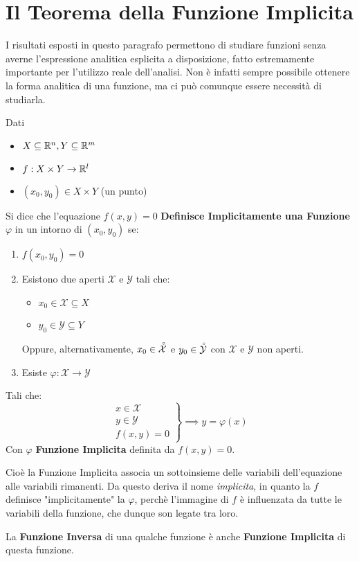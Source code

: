 \newpage
\section{Il Teorema della Funzione Implicita}
I risultati esposti in questo paragrafo permettono di studiare funzioni senza averne l'espressione analitica esplicita a disposizione, fatto estremamente importante per l'utilizzo reale dell'analisi. Non è infatti sempre possibile ottenere la forma analitica di una funzione, ma ci può comunque essere necessità di studiarla.
\begin{definition}
	\label{def:funz_impl}
	Dati
	\begin{itemize}[noitemsep]
		\item $X \subseteq \mathbb{R}^n, Y \subseteq \mathbb{R}^m$
		\item $f: X \times Y \to \mathbb{R}^l$
		\item $(x_0, y_0) \in X \times Y$ (un punto)
	\end{itemize}
	Si dice che l'equazione $f(x,y) = 0$ \textbf{Definisce Implicitamente una Funzione} $\varphi$ in un intorno di $(x_0,y_0)$ se:
	\begin{enumerate}
		\item $f(x_0,y_0) = 0$
		\item Esistono due aperti $\mathcal{X}$ e $\mathcal{Y}$ tali che:
			\begin{itemize}[noitemsep, topsep=0pt]
				\item $x_0 \in \mathcal{X} \subseteq X$
				\item $y_0 \in \mathcal{Y} \subseteq Y$
			\end{itemize}
			\begin{note}
				Oppure, alternativamente, $x_0 \in \accentset{\circ}{\mathcal{X}}$ e $y_0 \in \accentset{\circ}{\mathcal{Y}}$ con $\mathcal{X}$ e $\mathcal{Y}$ non aperti.
			\end{note}\vspace*{-2ex}
		\item Esiste $\varphi: \mathcal{X} \to \mathcal{Y}$
	\end{enumerate}
	Tali che:
	\[
		\left.
		\begin{array}{l}
			x \in \mathcal{X}\\
			y \in \mathcal{Y}\\
			f(x,y) = 0
		\end{array}
		\right\}
		\implies
		y = \varphi(x)
	\]
	Con $\varphi$ \textbf{Funzione Implicita} definita da $f(x,y)=0$.

	\vspace*{\baselineskip}
	Cioè la Funzione Implicita associa un sottoinsieme delle variabili dell'equazione alle variabili rimanenti. Da questo deriva il nome \textit{implicita}, in quanto la $f$ definisce "implicitamente" la $\varphi$, perchè l'immagine di $f$ è influenzata da tutte le variabili della funzione, che dunque son legate tra loro.
	\begin{note}
		La \textbf{Funzione Inversa} di una qualche funzione è anche \textbf{Funzione Implicita} di questa funzione.
	\end{note}
\end{definition}
